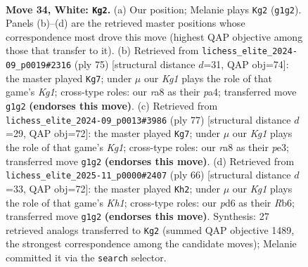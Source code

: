 \documentclass[11pt]{article}
\begin{document}
\clearpage

\begin{figure}[p]\centering
\begin{subfigure}{0.46\textwidth}\centering
\resizebox{\linewidth}{!}{%
\newchessgame
\chessboard[
  setfen={r7/2Q4p/3pkp2/8/pP6/6P1/P4P1P/4q1K1 w - - 3 34},
  showmover=false,
  pgfstyle=straightmove, color=movearrow, markmove={g1-g2}
]}
\caption{}
\end{subfigure}\hfill
\begin{subfigure}{0.46\textwidth}\centering
\resizebox{\linewidth}{!}{%
\newchessgame
\chessboard[
  setfen={4Q1k1/5p2/1p4pp/p7/P6P/2P2P1K/1q6/8 b - - 3 38},
  showmover=false,
  pgfstyle=straightmove, color=movearrow, markmove={g8-g7}
]}
\caption{}
\end{subfigure}
\\[4pt]
\begin{subfigure}{0.46\textwidth}\centering
\resizebox{\linewidth}{!}{%
\newchessgame
\chessboard[
  setfen={4Q1k1/5p2/6pp/8/p7/P2qP2P/5PP1/6K1 b - - 4 39},
  showmover=false,
  pgfstyle=straightmove, color=movearrow, markmove={g8-g7}
]}
\caption{}
\end{subfigure}\hfill
\begin{subfigure}{0.46\textwidth}\centering
\resizebox{\linewidth}{!}{%
\newchessgame
\chessboard[
  setfen={2r3k1/Q4p1p/1R2p3/6p1/P7/7P/6P1/5q1K w - - 1 34},
  showmover=false,
  pgfstyle=straightmove, color=movearrow, markmove={h1-h2}
]}
\caption{}
\end{subfigure}
\caption{\textbf{Move 34, White: \texttt{Kg2}.} (a) Our position; Melanie plays \texttt{Kg2} (\texttt{g1g2}). Panels (b)--(d) are the retrieved master positions whose correspondence most drove this move (highest QAP objective among those that transfer to it). (b) Retrieved from \texttt{lichess\_elite\_2024-09\_p0019\#2316} (ply 75) [structural distance $d$=31, QAP obj=74]: the master played \texttt{Kg7}; under $\mu$ our \emph{Kg1} plays the role of that game's \emph{Kg1}; cross-type roles: our \emph{r}a8 as their \emph{p}a4; transferred move \texttt{g1g2} \textbf{(endorses this move)}. (c) Retrieved from \texttt{lichess\_elite\_2024-09\_p0013\#3986} (ply 77) [structural distance $d$=29, QAP obj=72]: the master played \texttt{Kg7}; under $\mu$ our \emph{Kg1} plays the role of that game's \emph{Kg1}; cross-type roles: our \emph{r}a8 as their \emph{p}e3; transferred move \texttt{g1g2} \textbf{(endorses this move)}. (d) Retrieved from \texttt{lichess\_elite\_2025-11\_p0000\#2407} (ply 66) [structural distance $d$=33, QAP obj=72]: the master played \texttt{Kh2}; under $\mu$ our \emph{Kg1} plays the role of that game's \emph{Kh1}; cross-type roles: our \emph{p}d6 as their \emph{R}b6; transferred move \texttt{g1g2} \textbf{(endorses this move)}. Synthesis: 27 retrieved analogs transferred to \texttt{Kg2} (summed QAP objective 1489, the strongest correspondence among the candidate moves); Melanie committed it via the \texttt{search} selector.}
\label{fig:thought-m66}
\end{figure}
\end{document}
